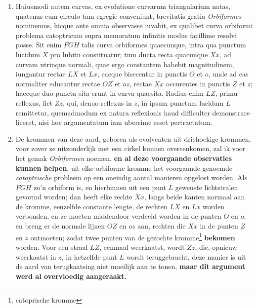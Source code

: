 \documentclass[10pt,a4paper]{article}
\newcommand{\switchenum}{\setcounter{enumi}{\arabic{enumi}-1}\switchcolumn}
\begin{document}
\begin{paracol}{2}
\begin{enumerate}[topsep=1px]
		
		\switchcolumn*
		
		
		
		\item Huiusmodi autem curvas, ex evolutione curvarum triangularium natas, quatenus cum circulo tam egregie conveniunt, brevitatis gratia \textit{Orbiformes} nominemus, hicque ante omnia observasse iuvabit, ex qualibet curva orbiformi problema catoptricum supra memoratum infinitis modus facillime resolvi posse. Sit enim $FGH$ talis curva orbiformes quaecunque, intra qua punctum lucidum $X$ pro lubitu constituatur; tum ducta recta quacunque $Xx$, ad curvam utrinque normali, quae ergo constantem habebit magnitudinem, iungantur rectae $LX$ et $Lx$, eaeque bisecentur in punctis $O$ et $o$, unde ad eas normaliter educantur rectae $OZ$ et $oz$, rectae $Xx$ occurentes in punctis $Z$ et $z$; haecque duo puncta sita erunt in curva quaesita. Radius enim $LZ$, primu reflexus, fiet $Zz$, qui, denuo reflexus in $z$, in ipsum punctum lucidum $L$ remittetur, quemadmodum ex natura reflexionis haud difficulter demonstrare liceret, nisi hoc argumentatum iam uberrime esset pertractatum.
		
		\switchenum
		\item De krommen van deze aard, geboren als evolventen uit driehoekige krommen, voor zover ze uitzonderlijk met een cirkel kunnen overeenkomen, zal ik voor het gemak \textit{Orbiformen} noemen, \textbf{en al deze voorgaande observaties  kunnen helpen}, uit elke orbiforme kromme het voorgaande genoemde \textit{catoptrische} probleem op een oneindig aantal manieren opgelost worden. Als $FGH$ zo'n orbiform is, en hierbinnen uit een punt {\color{red}$L$} gewenste lichtstralen gevormd worden; dan heeft elke rechte $Xx$, langs beide kanten normaal aan de kromme, eenzelfde constante lengte, de rechten $LX$ en $Lx$ worden verbonden, en ze moeten middendoor verdeeld worden in de punten $O$ en $o$, en breng er de normale lijnen $OZ$ en $oz$ aan, rechten die $Xx$ in de punten $Z$ en $z$ ontmoeten; zodat twee punten van de gezochte kromme\footnote{catoprische kromme} \textbf{bekomen} worden. Voor een straal $LZ$, eenmaal weerkaatst, wordt $Zz$, die,  opnieuw weerkaatst in $z$, in hetzelfde punt $L$ wordt teruggebracht, deze manier is uit de aard van terugkaatsing niet moeilijk aan te tonen, \textbf{maar dit argument werd al overvloedig aangeraakt.}
		\switchcolumn*
		

\end{enumerate}
\end{paracol}
\end{document}
